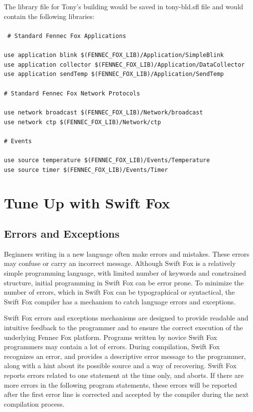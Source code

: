 \newpage

The library file for Tony's building would be saved in tony-bld.sfl file
and would contain the following libraries:				\\
\\
\texttt{
\# Standard Fennec Fox Applications					\\
\\
use application blink \$(FENNEC\_FOX\_LIB)/Application/SimpleBlink	\\
use application collector \$(FENNEC\_FOX\_LIB)/Application/DataCollector\\
use application sendTemp \$(FENNEC\_FOX\_LIB)/Application/SendTemp	\\
\\
\# Standard Fennec Fox Network Protocols				\\
\\
use network broadcast \$(FENNEC\_FOX\_LIB)/Network/broadcast		\\
use network ctp \$(FENNEC\_FOX\_LIB)/Network/ctp			\\
\\
\# Events								\\
\\
use source temperature \$(FENNEC\_FOX\_LIB)/Events/Temperature		\\
use source timer \$(FENNEC\_FOX\_LIB)/Events/Timer			\\
}

\newpage

\section{Tune Up with Swift Fox}

\subsection{Errors and Exceptions}

Beginners writing in a new language often make errors and mistakes. These
errors may confuse or carry an incorrect message. Although Swift Fox is a
relatively simple programming language, with limited number of keywords and
constrained structure, initial programming in Swift Fox can be error prone.
To minimize the number of errors, which in Swift Fox can be typographical
or syntactical, the Swift Fox compiler has a mechanism to catch language
errors and exceptions.

Swift Fox errors and exceptions mechanisms are designed to provide
readable and intuitive feedback to the programmer and to ensure the correct
execution of the underlying Fennec Fox platform. Programs written by novice
Swift Fox programmers may contain a lot of errors. During compilation,
Swift Fox recognizes an error, and provides a descriptive error message to
the programmer, along with a hint about its possible source and a way of
recovering. Swift Fox reports errors related to one statement at the time
only, and aborts. If there are more errors in the following program
statements, these errors will be reported after the first error line is
corrected and accepted by the compiler during the next compilation
process.								

